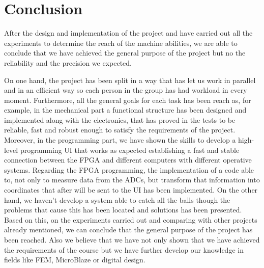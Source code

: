 \chapter{Conclusion}
\label{chap:conclusion}

After the design and implementation of the project and have carried out all the experiments to determine the reach of the machine abilities, we are able to conclude that we have achieved the general purpose of the project but no the reliability and the precision we expected.

On one hand, the project has been split in a way that has let us work in parallel and in an efficient way so each person in the group has had workload in every moment.
Furthermore, all the general goals for each task has been reach as, for example, in the mechanical part a functional structure has been designed and implemented along with the electronics, that has proved in the tests to be reliable, fast and robust enough to satisfy the requirements of the project.
Moreover, in the programming part, we have shown the skills to develop a high-level programming UI that works as expected establishing a fast and stable connection between the FPGA and different computers with different operative systems.
Regarding the FPGA programming, the implementation of a code able to, not only to measure data from the ADCs, but transform that information into coordinates that after will be sent to the UI has been implemented.
On the other hand, we haven't develop a system able to catch all the balls though the problems that cause this has been located and solutions has been presented.
Based on this, on the experiments carried out and comparing with other projects already mentioned, we can conclude that the general purpose of the project has been reached.
Also we believe that we have not only shown that we have  achieved the requirements of the course but we have further develop our knowledge in fields like FEM, MicroBlaze or digital design.
